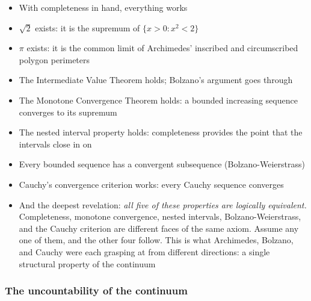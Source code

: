 \documentclass[
  10pt,
  letterpaper,
]{scrbook}
\providecommand{\tightlist}{%
  \setlength{\itemsep}{0pt}\setlength{\parskip}{0pt}}
\begin{document}
\begin{itemize}
\tightlist
\item
  With completeness in hand, everything works
\item
  \(\sqrt{2}\) exists: it is the supremum of \(\{x > 0 : x^2 < 2\}\)
\item
  \(\pi\) exists: it is the common limit of Archimedes' inscribed and
  circumscribed polygon perimeters
\item
  The Intermediate Value Theorem holds; Bolzano's argument goes through
\item
  The Monotone Convergence Theorem holds: a bounded increasing sequence
  converges to its supremum
\item
  The nested interval property holds: completeness provides the point
  that the intervals close in on
\item
  Every bounded sequence has a convergent subsequence
  (Bolzano-Weierstrass)
\item
  Cauchy's convergence criterion works: every Cauchy sequence converges
\item
  And the deepest revelation: \emph{all five of these properties are
  logically equivalent.} Completeness, monotone convergence, nested
  intervals, Bolzano-Weierstrass, and the Cauchy criterion are different
  faces of the same axiom. Assume any one of them, and the other four
  follow. This is what Archimedes, Bolzano, and Cauchy were each
  grasping at from different directions: a single structural property of
  the continuum
\end{itemize}

\subsubsection*{The uncountability of the
continuum}\label{the-uncountability-of-the-continuum}
\end{document}
